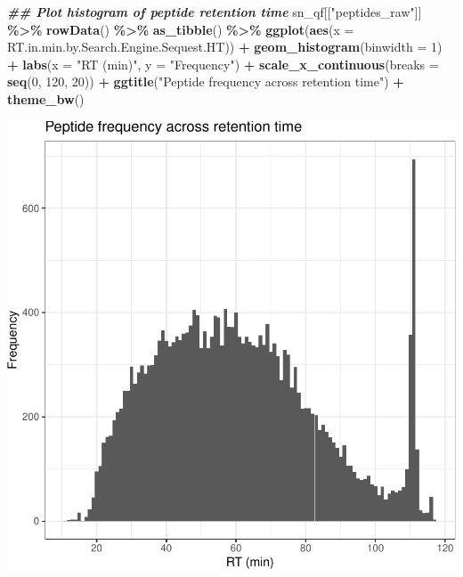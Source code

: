 \documentclass[9pt,a4paper,]{extarticle}
\newenvironment{Shaded}{\begin{snugshade}}{\end{snugshade}}
\newcommand{\AttributeTok}[1]{\textcolor[rgb]{0.13,0.29,0.53}{#1}}
\newcommand{\DecValTok}[1]{\textcolor[rgb]{0.00,0.00,0.81}{#1}}
\newcommand{\DocumentationTok}[1]{\textcolor[rgb]{0.56,0.35,0.01}{\textbf{\textit{#1}}}}
\newcommand{\FunctionTok}[1]{\textcolor[rgb]{0.13,0.29,0.53}{\textbf{#1}}}
\newcommand{\NormalTok}[1]{#1}
\newcommand{\SpecialCharTok}[1]{\textcolor[rgb]{0.81,0.36,0.00}{\textbf{#1}}}
\newcommand{\StringTok}[1]{\textcolor[rgb]{0.31,0.60,0.02}{#1}}
\begin{document}
\begin{Shaded}
\begin{Highlighting}[]
\DocumentationTok{\#\# Plot histogram of peptide retention time}
\NormalTok{sn\_qf[[}\StringTok{"peptides\_raw"}\NormalTok{]] }\SpecialCharTok{\%\textgreater{}\%}
  \FunctionTok{rowData}\NormalTok{() }\SpecialCharTok{\%\textgreater{}\%}
  \FunctionTok{as\_tibble}\NormalTok{() }\SpecialCharTok{\%\textgreater{}\%}
  \FunctionTok{ggplot}\NormalTok{(}\FunctionTok{aes}\NormalTok{(}\AttributeTok{x =}\NormalTok{ RT.in.min.by.Search.Engine.Sequest.HT)) }\SpecialCharTok{+}
  \FunctionTok{geom\_histogram}\NormalTok{(}\AttributeTok{binwidth =} \DecValTok{1}\NormalTok{) }\SpecialCharTok{+}
  \FunctionTok{labs}\NormalTok{(}\AttributeTok{x =} \StringTok{"RT (min)"}\NormalTok{, }\AttributeTok{y =} \StringTok{"Frequency"}\NormalTok{) }\SpecialCharTok{+}
  \FunctionTok{scale\_x\_continuous}\NormalTok{(}\AttributeTok{breaks =} \FunctionTok{seq}\NormalTok{(}\DecValTok{0}\NormalTok{, }\DecValTok{120}\NormalTok{, }\DecValTok{20}\NormalTok{)) }\SpecialCharTok{+}
  \FunctionTok{ggtitle}\NormalTok{(}\StringTok{"Peptide frequency across retention time"}\NormalTok{) }\SpecialCharTok{+}
  \FunctionTok{theme\_bw}\NormalTok{()}
\end{Highlighting}
\end{Shaded}

\begin{center}\includegraphics[height=0.3\textheight]{workflow_expressions_files/figure-latex/lfq_RT-1} \end{center}
\end{document}
